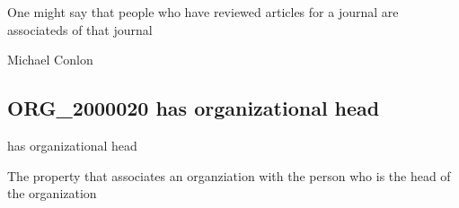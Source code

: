 \documentclass[letterpaper,10pt,english]{sphinxmanual}
\begin{document}
\begin{sphinxShadowBox}

\sphinxAtStartPar
{\hyperref[\detokenize{doc-ORG_0000001::doc}]{}}
\end{sphinxShadowBox}

\begin{sphinxShadowBox}

\sphinxAtStartPar
One might say that people who have reviewed articles for a journal are associateds of that journal
\end{sphinxShadowBox}

\begin{sphinxShadowBox}

\sphinxAtStartPar
Michael Conlon 
\end{sphinxShadowBox}
\begin{quote}

\ignorespaces \end{quote}


\subsection{ORG\_2000020 \sphinxhyphen{} has organizational head}
\label{\detokenize{doc-ORG_2000020:org-2000020-has-organizational-head}}\label{\detokenize{doc-ORG_2000020:index-0}}\label{\detokenize{doc-ORG_2000020::doc}}
\begin{sphinxShadowBox}

\sphinxAtStartPar
has organizational head
\end{sphinxShadowBox}

\begin{sphinxShadowBox}

\sphinxAtStartPar
{}
\end{sphinxShadowBox}

\begin{sphinxShadowBox}

\sphinxAtStartPar
The property that associates an organziation with the person who is the head of the organization
\end{sphinxShadowBox}
\end{document}
